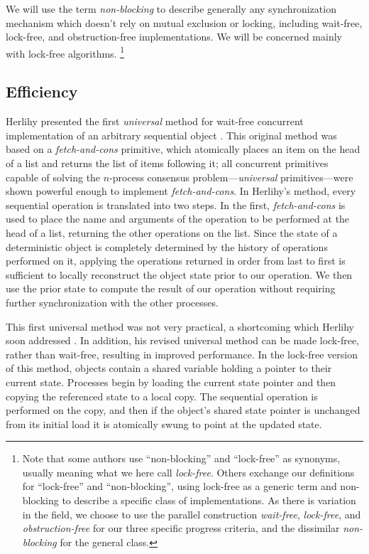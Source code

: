 \documentclass[12pt,twoside]{article}
\newcommand{\subsecput}[2]{\subsection{#2}\label{sec:#1}}
\begin{document}
We will use the term \emph{non-blocking} to describe
generally any synchronization mechanism which doesn't rely on mutual
exclusion or locking, including wait-free, lock-free,
and obstruction-free implementations.
We will be concerned mainly with lock-free algorithms.%
\footnote{Note that some authors use ``non-blocking'' and
  ``lock-free'' as synonyms, usually meaning what we here call
  \emph{lock-free}.  Others exchange our definitions for ``lock-free''
  and ``non-blocking'', using lock-free as a generic term and non-blocking
  to describe a specific class of implementations.  As there is
  variation in the field, we choose to use the parallel construction
  \emph{wait-free}, \emph{lock-free}, and \emph{obstruction-free} for
  our three specific progress criteria, and the dissimilar
  \emph{non-blocking} for the general class.}

\subsecput{efficiency}{Efficiency}
Herlihy presented the first \emph{universal} method for wait-free
concurrent implementation of an arbitrary sequential object
\cite{Herlihy88,Herlihy91}.  This original method was based on
a \emph{fetch-and-cons} primitive, which atomically places
an item on the head of a list and returns the list of items following
it; all concurrent primitives capable of solving the
$n$-process consensus problem---\emph{universal} primitives---were
shown powerful enough to implement \emph{fetch-and-cons}.
In Herlihy's method, 
every sequential operation is translated into two steps.  In the first,
\emph{fetch-and-cons} is used to place the name and arguments of the
operation to be performed
at the head of a list, returning the other operations on the list.
Since the state
of a deterministic object is completely determined by the history of
operations performed on it, applying the operations returned
in order from last to first is sufficient to locally reconstruct the
object state 
prior to our operation.
We then use the prior state to compute the result of our operation
without requiring further synchronization with the other processes.

This first universal method was not very practical, a shortcoming
which Herlihy soon addressed \cite{Herlihy93}.  In addition, his revised universal
method can be made lock-free, rather than wait-free, resulting in
improved performance.  In the lock-free version of this method,
objects contain a shared variable
holding a pointer to their current state.  Processes begin by loading
the current state pointer and then copying the referenced state to a
local copy.  The sequential operation is performed on the
copy, and then if the object's shared state pointer is unchanged from
its initial load it is atomically swung to point at the updated state.
\end{document}
